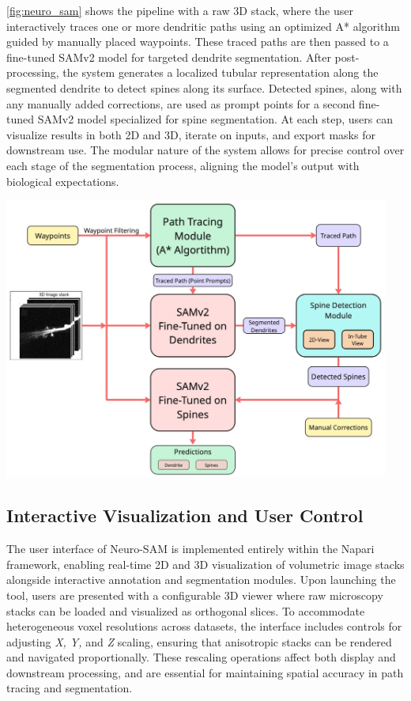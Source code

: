 \autoref{fig:neuro_sam} shows the pipeline with a raw 3D stack, where the user interactively traces one or more dendritic paths using an optimized A* algorithm guided by manually placed waypoints. These traced paths are then passed to a fine-tuned \gls{SAMv2} model for targeted dendrite segmentation. After post-processing, the system generates a localized tubular representation along the segmented dendrite to detect spines along its surface. Detected spines, along with any manually added corrections, are used as prompt points for a second fine-tuned \gls{SAMv2} model specialized for spine segmentation. At each step, users can visualize results in both 2D and 3D, iterate on inputs, and export masks for downstream use. The modular nature of the system allows for precise control over each stage of the segmentation process, aligning the model’s output with biological expectations.

\begin{center}
\includegraphics[width=0.95\textwidth]{figures/15_neuro_sam.jpg}
\label{fig:neuro_sam}
\end{center}

\subsection{Interactive Visualization and User Control}
The user interface of Neuro-\gls{SAM} is implemented entirely within the Napari framework, enabling real-time 2D and 3D visualization of volumetric image stacks alongside interactive annotation and segmentation modules. Upon launching the tool, users are presented with a configurable 3D viewer where raw microscopy stacks can be loaded and visualized as orthogonal slices. To accommodate heterogeneous voxel resolutions across datasets, the interface includes controls for adjusting \textit{X, Y,} and \textit{Z} scaling, ensuring that anisotropic stacks can be rendered and navigated proportionally. These rescaling operations affect both display and downstream processing, and are essential for maintaining spatial accuracy in path tracing and segmentation.

